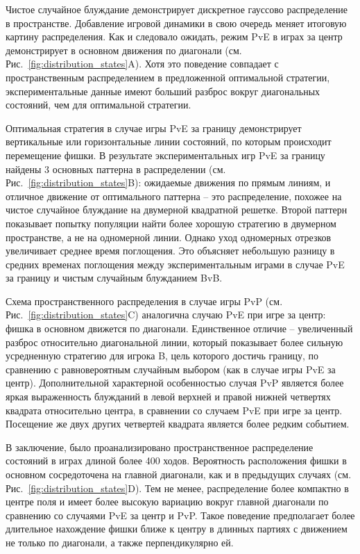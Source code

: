 Чистое случайное блуждание демонстрирует дискретное гауссово распределение в пространстве. 
Добавление игровой динамики в свою очередь меняет итоговую картину распределения. 
Как и следовало ожидать, режим PvE в играх за центр демонстрирует в основном движения по диагонали (см. Рис.~\cref{fig:distribution_states}A). 
Хотя это поведение совпадает с пространственным распределением в предложенной оптимальной стратегии, 
экспериментальные данные имеют больший разброс вокруг диагональных состояний, чем для оптимальной стратегии.

Оптимальная стратегия в случае игры PvE за границу демонстрирует вертикальные или горизонтальные линии состояний, 
по которым происходит перемещение фишки. В результате экспериментальных игр PvE за границу найдены 
3 основных паттерна в распределении (см. Рис.~\cref{fig:distribution_states}B): ожидаемые движения по прямым линиям, и 
отличное движение от оптимального паттерна -- это распределение, похожее на чистое случайное блуждание на двумерной квадратной решетке. 
Второй паттерн показывает попытку популяции найти более хорошую стратегию в двумерном пространстве, а не на одномерной линии. 
Однако уход одномерных отрезков увеличивает среднее время поглощения. Это объясняет небольшую разницу в средних временах 
поглощения между экспериментальным играми в случае PvE за границу и чистым случайным блужданием BvB.

Схема пространственного распределения в случае игры PvP (см. Рис.~\cref{fig:distribution_states}C) аналогична случаю PvE при игре за центр: 
фишка в основном движется по диагонали. Единственное отличие -- увеличенный разброс относительно диагональной линии, 
который показывает более сильную усредненную стратегию для игрока B, цель которого достичь границу, 
по сравнению с равновероятным случайным выбором (как в случае игры PvE за центр).
Дополнительной характерной особенностью случая PvP является более яркая выраженность
блужданий в левой верхней и правой нижней четвертях квадрата относительно центра, в сравнении со случаем PvE при игре за центр.
Посещение же двух других четвертей квадрата является более редким событием.

В заключение, было проанализировано пространственное распределение состояний в играх длиной более 400 ходов. 
Вероятность расположения фишки в основном сосредоточена на главной диагонали, как и в предыдущих случаях (см. Рис.~\cref{fig:distribution_states}D). 
Тем не менее, распределение более компактно в центре поля и имеет более высокую вариацию вокруг главной диагонали 
по сравнению со случаями PvE за центр и PvP. Такое поведение предполагает более длительное нахождение фишки ближе к центру 
в длинных партиях с движением не только по диагонали, а также перпендикулярно ей.


